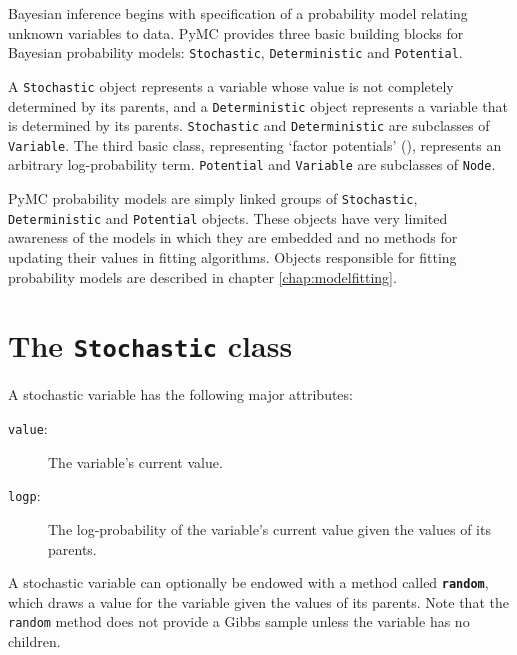 
Bayesian inference begins with specification of a probability model relating unknown variables to data. PyMC provides three basic building blocks for Bayesian probability models: \texttt{Stochastic}, \texttt{Deterministic} and \texttt{Potential}. 

A \texttt{Stochastic} object represents a variable whose value is not completely determined by its parents, and a \texttt{Deterministic} object represents a variable that is determined by its parents. \texttt{Stochastic} and \texttt{Deterministic} are subclasses of \texttt{Variable}. The third basic class, representing `factor potentials' (\cite{dawidmarkov,jordangraphical}), represents an arbitrary log-probability term. \texttt{Potential} and \texttt{Variable} are subclasses of \texttt{Node}.


\medskip
PyMC probability models are simply linked groups of \texttt{Stochastic}, \texttt{Deterministic} and \texttt{Potential} objects. These objects have very limited awareness of the models in which they are embedded and no methods for updating their values in fitting algorithms. Objects responsible for fitting probability models are described in chapter \ref{chap:modelfitting}.
 

\hypertarget{stochastic}{}
\section*{The \texttt{Stochastic} class} \label{stochastic}

A stochastic variable has the following major attributes: 
\begin{description}
    \item[\texttt{value}:] The variable's current value.
    \item[\texttt{logp}:] The log-probability of the variable's current value given the values of its parents.
\end{description}
A stochastic variable can optionally be endowed with a method called \texttt{\bfseries random}, which draws a value for the variable given the values of its parents. Note that the \texttt{random} method does not provide a Gibbs sample unless the variable has no children.

